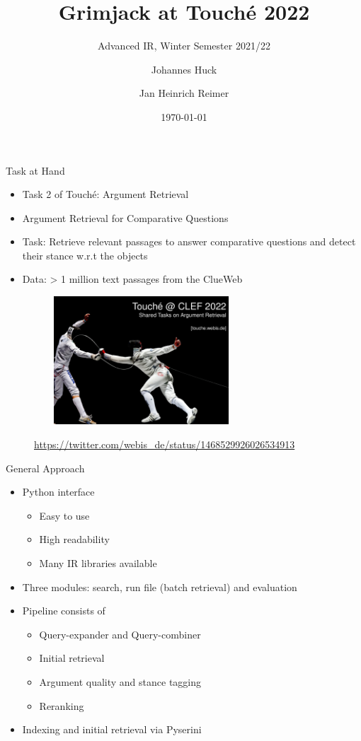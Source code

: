 \documentclass[english]{mlutalk}
\title{Grimjack at Touché 2022}
\subtitle{Advanced IR, Winter Semester 2021/22}
\author{Johannes Huck \and Jan Heinrich Reimer}
\institute{Martin Luther University Halle-Wittenberg}
\date{\today}
\begin{document}
\titleframe

\begin{frame}{Task at Hand}
  \begin{itemize}
    \item Task 2 of Touché: Argument Retrieval
    \item Argument Retrieval for Comparative Questions
    \item Task: Retrieve relevant passages to answer comparative questions and detect their stance w.r.t the objects
    \item Data: > 1 million text passages from the ClueWeb
  \end{itemize}
  \begin{figure}
      \centering
      \includegraphics[height=4.8cm, width=8cm]{figures/touche}\\
      \begin{tiny}
        \url{https://twitter.com/webis_de/status/1468529926026534913}
      \end{tiny}
  \end{figure}
\end{frame}

\begin{frame}{General Approach}
  \begin{itemize}
    \item Python interface
    \begin{itemize}
        \item Easy to use
        \item High readability
        \item Many IR libraries available
    \end{itemize}
    \item Three modules: search, run file (batch retrieval) and evaluation
    \item Pipeline consists of
    \begin{itemize}
        \item Query-expander and Query-combiner
        \item Initial retrieval
        \item Argument quality and stance tagging
        \item Reranking
    \end{itemize}
    \item Indexing and initial retrieval via Pyserini~\cite{LinMLYPN2021}
  \end{itemize}
\end{frame}
\end{document}
